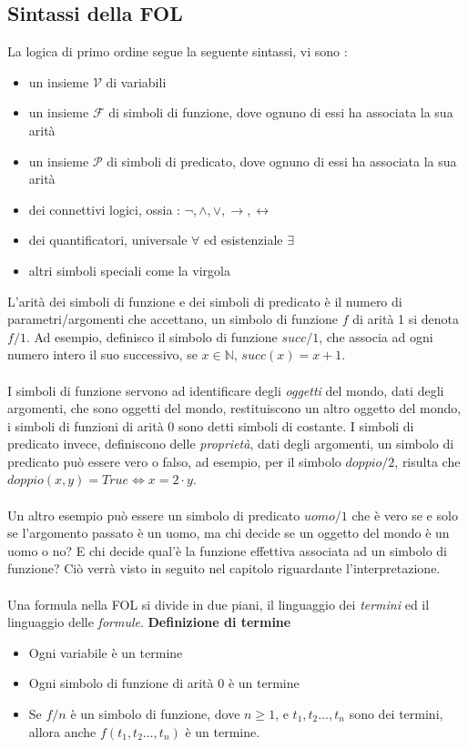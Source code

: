 \documentclass[12pt, letterpaper]{article}
\newcommand{\acc}{\\\hphantom{}\\}
\newcommand{\V}{{\mathcal{V} }}
\newcommand{\F}{{\mathcal{F} }}
\newcommand{\Pred}{{\mathcal{P} }}
\begin{document}
\subsection{Sintassi della FOL}
La logica di primo ordine segue la seguente sintassi, vi sono : \begin{itemize}
    \item un insieme $\V$ di variabili 
    \item un insieme $\F$ di simboli di funzione, dove ognuno di essi ha associata la sua arità 
    \item un insieme $\Pred$ di simboli di predicato, dove ognuno di essi ha associata la sua arità 
    \item dei connettivi logici, ossia : $\lnot,\land,\lor,\rightarrow,\leftrightarrow $ 
    \item dei quantificatori, universale $\forall$ ed esistenziale $\exists$ 
    \item altri simboli speciali come la virgola
\end{itemize}
L'arità dei simboli di funzione e dei simboli di predicato è il numero di parametri/argomenti che accettano, 
un simbolo di funzione $f$ di arità 1 si denota $f/1$. Ad esempio, definisco il simbolo di funzione $succ/1$, che 
associa ad ogni numero intero il suo successivo, se $x\in\mathbb{N}$, $succ(x)=x+1$.\acc  
I simboli di funzione servono ad identificare degli \textit{oggetti} del mondo, dati degli argomenti, che sono 
oggetti del mondo, restituiscono un altro oggetto del mondo, i simboli di funzioni di arità 
0 sono detti simboli di costante. I simboli di predicato invece, definiscono delle 
\textit{proprietà}, dati degli argomenti, un simbolo di predicato può essere vero o falso, ad esempio, per il 
simbolo $doppio/2$, risulta che $doppio(x,y)=True\iff x=2\cdot y$.\acc 
Un altro esempio può essere un simbolo di predicato $uomo/1$ che è vero se e solo se l'argomento 
passato è un uomo, ma chi decide se un oggetto del mondo è un uomo o no? E chi decide qual'è la funzione 
effettiva associata ad un simbolo di funzione? Ciò verrà visto in seguito nel capitolo riguardante 
l'interpretazione.\acc 
Una formula nella FOL si divide in due piani, il linguaggio dei \textit{termini} ed il linguaggio delle 
\textit{formule}. \newpage
\textbf{Definizione di termine}\begin{itemize}
    \item Ogni variabile è un termine 
    \item Ogni simbolo di funzione di arità 0 è un termine 
    \item Se $f/n$ è un simbolo di funzione, dove $n\ge1$, e $t_1,t_2\dots,t_n$ sono dei termini, 
    allora anche $f(t_1,t_2\dots,t_n)$ è un termine.
\end{itemize}
\end{document}
